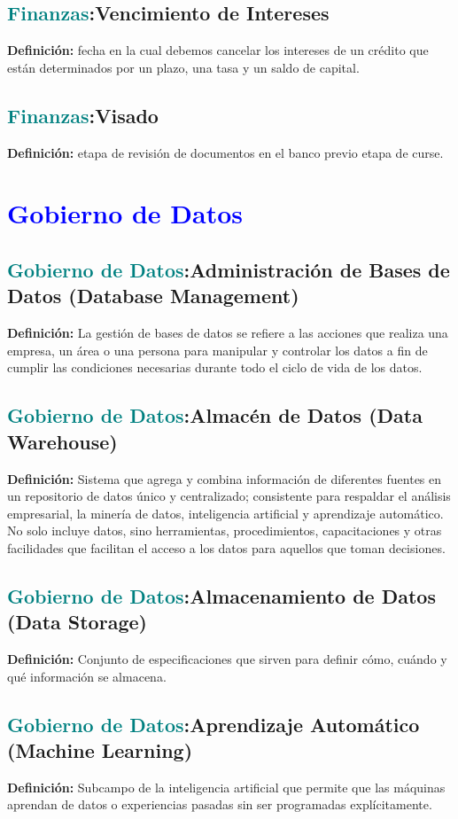 \documentclass[12pt]{article}
\begin{document}
\subsection{\textcolor{teal}{Finanzas}:{Vencimiento de Intereses}}
\textbf{Definición:} fecha en la cual debemos cancelar los intereses de un crédito que están determinados por un plazo, una tasa y un saldo de capital.
\subsection{\textcolor{teal}{Finanzas}:{Visado}}
\textbf{Definición:} etapa de revisión de documentos en el banco previo etapa de curse.
\section{\textcolor{blue}{Gobierno de Datos}}
\subsection{\textcolor{teal}{Gobierno de Datos}:{Administración de Bases de Datos (Database Management)}}
\textbf{Definición:} La gestión de bases de datos se refiere a las acciones que realiza una empresa, un área o una persona para manipular y controlar los datos a fin de cumplir las condiciones necesarias durante todo el ciclo de vida de los datos.
\subsection{\textcolor{teal}{Gobierno de Datos}:{Almacén de Datos (Data Warehouse)}}
\textbf{Definición:} Sistema que agrega y combina información de diferentes fuentes en un repositorio de datos único y centralizado; consistente para respaldar el análisis empresarial, la minería de datos, inteligencia artificial y aprendizaje automático. No solo incluye datos, sino herramientas, procedimientos, capacitaciones y otras facilidades que facilitan el acceso a los datos para aquellos que toman decisiones.
\subsection{\textcolor{teal}{Gobierno de Datos}:{Almacenamiento de Datos (Data Storage)}}
\textbf{Definición:} Conjunto de especificaciones que sirven para definir cómo, cuándo y qué información se almacena.
\subsection{\textcolor{teal}{Gobierno de Datos}:{Aprendizaje Automático (Machine Learning)}}
\textbf{Definición:} Subcampo de la inteligencia artificial que permite que las máquinas aprendan de datos o experiencias pasadas sin ser programadas explícitamente.
\end{document}
